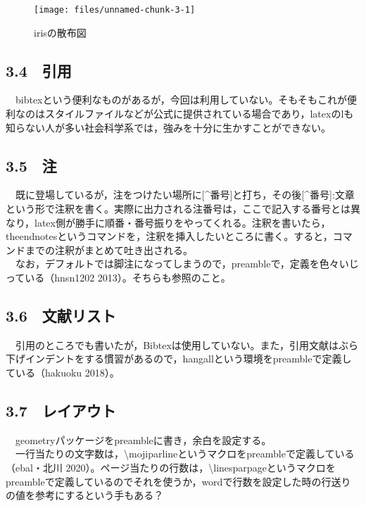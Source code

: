 \documentclass[
  a4paper]{ltjsarticle}
\let\footnote=\endnote
\begin{document}
\begin{figure}
\texttt{[image: files/unnamed-chunk-3-1]} \caption{irisの散布図 \label{fig:fig01}}\label{fig:unnamed-chunk-3}
\end{figure}

\hypertarget{ux5f15ux7528}{%
\subsection{3.4　引用}\label{ux5f15ux7528}}

　bibtexという便利なものがあるが，今回は利用していない。そもそもこれが便利なのはスタイルファイルなどが公式に提供されている場合であり，latexのlも知らない人が多い社会科学系では，強みを十分に生かすことができない。

\hypertarget{ux6ce8}{%
\subsection{3.5　注}\label{ux6ce8}}

　既に登場しているが，注をつけたい場所に{[}\^{}番号{]}と打ち，その後{[}\^{}番号{]}:文章という形で注釈を書く\footnote{例えばこんな感じ。}。実際に出力される注番号は，ここで記入する番号とは異なり，latex側が勝手に順番・番号振りをやってくれる。注釈を書いたら，theendnotesというコマンドを，注釈を挿入したいところに書く。すると，コマンドまでの注釈がまとめて吐き出される。\\
　なお，デフォルトでは脚注になってしまうので，preambleで，定義を色々いじっている（hnsn1202
2013）。そちらも参照のこと。

\hypertarget{ux6587ux732eux30eaux30b9ux30c8}{%
\subsection{3.6　文献リスト}\label{ux6587ux732eux30eaux30b9ux30c8}}

　引用のところでも書いたが，Bibtexは使用していない。また，引用文献はぶら下げインデントをする慣習があるので，hangallという環境をpreambleで定義している（hakuoku
2018）。

\hypertarget{ux30ecux30a4ux30a2ux30a6ux30c8}{%
\subsection{3.7　レイアウト}\label{ux30ecux30a4ux30a2ux30a6ux30c8}}

　geometryパッケージをpreambleに書き，余白を設定する。\\
　一行当たりの文字数は，\textbackslash mojiparlineというマクロをpreambleで定義している（ebal・北川
2020）。ページ当たりの行数は，\textbackslash linesparpageというマクロをpreambleで定義しているのでそれを使うか，wordで行数を設定した時の行送りの値を参考にするという手もある？
\end{document}
